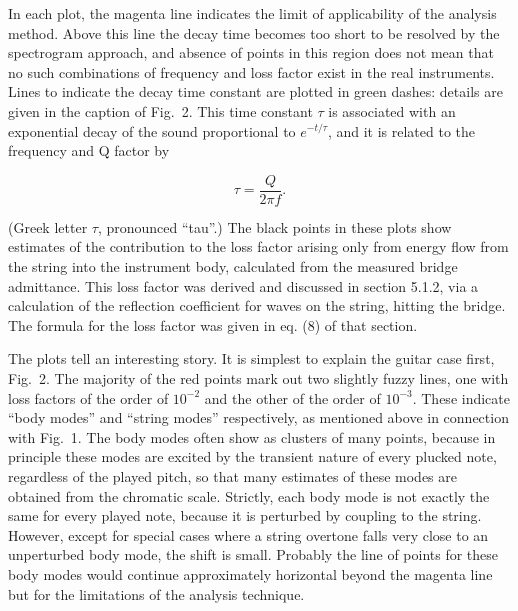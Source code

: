   In each plot, the magenta line indicates the limit of applicability of the 
  analysis method. Above this line the decay time becomes too short to be 
  resolved by the spectrogram approach, and absence of points in this region 
  does not mean that no such combinations of frequency and loss factor exist in 
  the real instruments. Lines to indicate the decay time constant are plotted 
  in green dashes: details are given in the caption of Fig.\ 2. This time 
  constant $\tau$ is associated with an exponential decay of the sound 
  proportional to $e^{-t/\tau}$, and it is related to the frequency and Q 
  factor by 

  \begin{equation*}\tau=\frac{Q}{2 \pi f} . \tag{1}\end{equation*} 

  (Greek letter $\tau$, pronounced ``tau''.) The black points in these plots 
  show estimates of the contribution to the loss factor arising only from 
  energy flow from the string into the instrument body, calculated from the 
  measured bridge admittance. This loss factor was derived and discussed in 
  section 5.1.2, via a calculation of the reflection coefficient for waves on 
  the string, hitting the bridge. The formula for the loss factor was given in 
  eq. (8) of that section. 

  The plots tell an interesting story. It is simplest to explain the guitar 
  case first, Fig.\ 2. The majority of the red points mark out two slightly 
  fuzzy lines, one with loss factors of the order of $10^{-2}$ and the other of 
  the order of $10^{-3}$. These indicate ``body modes'' and ``string modes'' 
  respectively, as mentioned above in connection with Fig.\ 1. The body modes 
  often show as clusters of many points, because in principle these modes are 
  excited by the transient nature of every plucked note, regardless of the 
  played pitch, so that many estimates of these modes are obtained from the 
  chromatic scale. Strictly, each body mode is not exactly the same for every 
  played note, because it is perturbed by coupling to the string. However, 
  except for special cases where a string overtone falls very close to an 
  unperturbed body mode, the shift is small. Probably the line of points for 
  these body modes would continue approximately horizontal beyond the magenta 
  line but for the limitations of the analysis technique. 

